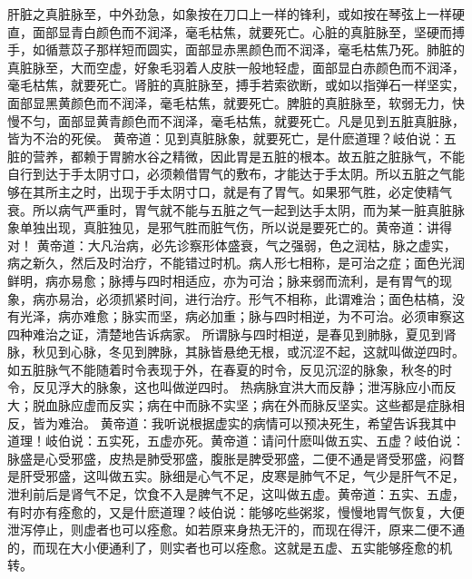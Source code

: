 \documentclass[a4paper,12pt,UTF8,twoside]{ctexbook}
\begin{document}
肝脏之真脏脉至，中外劲急，如象按在刀口上一样的锋利，或如按在琴弦上一样硬直，面部显青白颜色而不润泽，毫毛枯焦，就要死亡。心脏的真脏脉至，坚硬而搏手，如循薏苡子那样短而圆实，面部显赤黑颜色而不润泽，毫毛枯焦乃死。肺脏的真脏脉至，大而空虚，好象毛羽着人皮肤一般地轻虚，面部显白赤颜色而不润泽，毫毛枯焦，就要死亡。肾脏的真脏脉至，搏手若索欲断，或如以指弹石一样坚实，面部显黑黄颜色而不润泽，毫毛枯焦，就要死亡。脾脏的真脏脉至，软弱无力，快慢不匀，面部显黄青颜色而不润泽，毫毛枯焦，就要死亡。凡是见到五脏真脏脉，皆为不治的死侯。
黄帝道：见到真脏脉象，就要死亡，是什麽道理？岐伯说：五脏的营养，都赖于胃腑水谷之精微，因此胃是五脏的根本。故五脏之脏脉气，不能自行到达于手太阴寸口，必须赖借胃气的敷布，才能达于手太阴。所以五脏之气能够在其所主之时，出现于手太阴寸口，就是有了胃气。如果邪气胜，必定使精气衰。所以病气严重时，胃气就不能与五脏之气一起到达手太阴，而为某一脏真脏脉象单独出现，真脏独见，是邪气胜而脏气伤，所以说是要死亡的。黄帝道：讲得对！
黄帝道：大凡治病，必先诊察形体盛衰，气之强弱，色之润枯，脉之虚实，病之新久，然后及时治疗，不能错过时机。病人形七相称，是可治之症；面色光润鲜明，病亦易愈；脉搏与四时相适应，亦为可治；脉来弱而流利，是有胃气的现象，病亦易治，必须抓紧时间，进行治疗。形气不相称，此谓难治；面色枯槁，没有光泽，病亦难愈；脉实而坚，病必加重；脉与四时相逆，为不可治。必须审察这四种难治之证，清楚地告诉病家。
所谓脉与四时相逆，是春见到肺脉，夏见到肾脉，秋见到心脉，冬见到脾脉，其脉皆悬绝无根，或沉涩不起，这就叫做逆四时。如五脏脉气不能随着时令表现于外，在春夏的时令，反见沉涩的脉象，秋冬的时令，反见浮大的脉象，这也叫做逆四时。
热病脉宜洪大而反静；泄泻脉应小而反大；脱血脉应虚而反实；病在中而脉不实坚；病在外而脉反坚实。这些都是症脉相反，皆为难治。
黄帝道：我听说根据虚实的病情可以预决死生，希望告诉我其中道理！岐伯说：五实死，五虚亦死。黄帝道：请问什麽叫做五实、五虚？岐伯说：脉盛是心受邪盛，皮热是肺受邪盛，腹胀是脾受邪盛，二便不通是肾受邪盛，闷瞀是肝受邪盛，这叫做五实。脉细是心气不足，皮寒是肺气不足，气少是肝气不足，泄利前后是肾气不足，饮食不入是脾气不足，这叫做五虚。黄帝道：五实、五虚，有时亦有痊愈的，又是什麽道理？岐伯说：能够吃些粥浆，慢慢地胃气恢复，大便泄泻停止，则虚者也可以痊愈。如若原来身热无汗的，而现在得汗，原来二便不通的，而现在大小便通利了，则实者也可以痊愈。这就是五虚、五实能够痊愈的机转。
\end{document}
